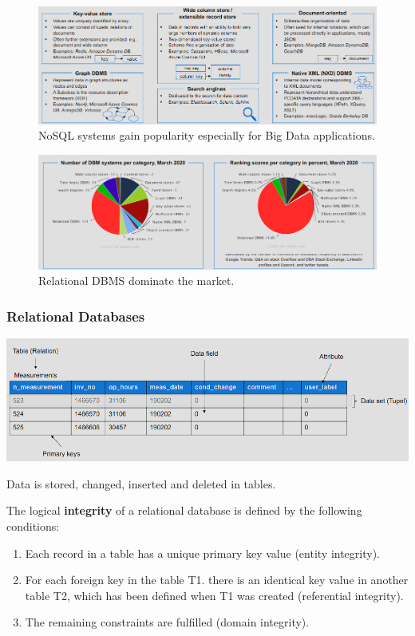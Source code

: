 \documentclass[12pt, a4paper, oneside, justified]{article}
\begin{document}
\begin{figure}[!h]
    \centering
    \includegraphics[width=1\textwidth]{../img/3-6.png}
    \caption{NoSQL systems gain popularity especially for Big Data applications.}
    \label{img/3-6}
\end{figure}

\begin{figure}[!h]
    \centering
    \includegraphics[width=1\textwidth]{../img/3-7.png}
    \caption{Relational DBMS dominate the market.}
    \label{img/3-7}
\end{figure}

\subsubsection{Relational Databases}

\begin{center}
\includegraphics[width=1\textwidth]{../img/3-8.png}
\end{center}

Data is stored, changed, inserted and deleted in tables.

The logical \textbf{integrity} of a relational database is defined by the following conditions:
\begin{enumerate}
    \item Each record in a table has a unique primary key value (entity integrity).
    \item For each foreign key in the table T1. there is an identical key value in another table T2, which has been defined when T1 was created (referential integrity).
    \item The remaining constraints are fulfilled (domain integrity).
\end{enumerate}
\end{document}
